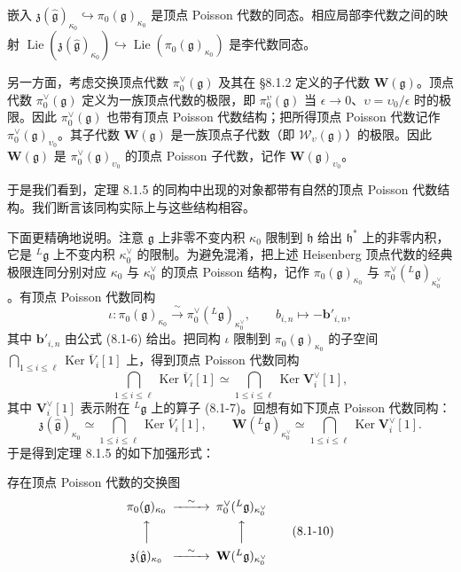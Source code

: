 \begin{lemma}
    嵌入 $\mathfrak z(\hat{\mathfrak g})_{\kappa_0}\hookrightarrow\pi_0(\mathfrak g)_{\kappa_0}$ 是顶点 Poisson 代数的同态。相应局部李代数之间的映射 $\operatorname{Lie}(\mathfrak z(\hat{\mathfrak g})_{\kappa_0})\hookrightarrow\operatorname{Lie}(\pi_0(\mathfrak g)_{\kappa_0})$ 是李代数同态。
\end{lemma}

另一方面，考虑交换顶点代数 $\pi^\vee_0(\mathfrak g)$ 及其在 §8.1.2 定义的子代数 $\mathbf W(\mathfrak g)$。顶点代数 $\pi^\vee_0(\mathfrak g)$ 定义为一族顶点代数的极限，即 $\pi^\upsilon_0(\mathfrak g)$ 当 $\epsilon\to0$、$\upsilon=\upsilon_0/\epsilon$ 时的极限。因此 $\pi^\vee_0(\mathfrak g)$ 也带有顶点 Poisson 代数结构；把所得顶点 Poisson 代数记作 $\pi^\vee_0(\mathfrak g)_{\upsilon_0}$。其子代数 $\mathbf W(\mathfrak g)$ 是一族顶点子代数（即 $\mathcal W_\upsilon(\mathfrak g)$）的极限。因此 $\mathbf W(\mathfrak g)$ 是 $\pi^\vee_0(\mathfrak g)_{\upsilon_0}$ 的顶点 Poisson 子代数，记作 $\mathbf W(\mathfrak g)_{\upsilon_0}$。

于是我们看到，定理 8.1.5 的同构中出现的对象都带有自然的顶点 Poisson 代数结构。我们断言该同构实际上与这些结构相容。

下面更精确地说明。注意 $\mathfrak g$ 上非零不变内积 $\kappa_0$ 限制到 $\mathfrak h$ 给出 $\mathfrak h^*$ 上的非零内积，它是 ${}^L\mathfrak g$ 上不变内积 $\kappa^\vee_0$ 的限制。为避免混淆，把上述 Heisenberg 顶点代数的经典极限连同分别对应 $\kappa_0$ 与 $\kappa^\vee_0$ 的顶点 Poisson 结构，记作 $\pi_0(\mathfrak g)_{\kappa_0}$ 与 $\pi^\vee_0({}^L\mathfrak g)_{\kappa^\vee_0}$。有顶点 Poisson 代数同构
\[
    \iota:\pi_0(\mathfrak g)_{\kappa_0}\xrightarrow{\ \sim\ }\pi^\vee_0({}^L\mathfrak g)_{\kappa^\vee_0},
    \qquad b_{i,n}\mapsto-\mathbf b'_{i,n},
\]
其中 $\mathbf b'_{i,n}$ 由公式 (8.1-6) 给出。把同构 $\iota$ 限制到 $\pi_0(\mathfrak g)_{\kappa_0}$ 的子空间 $\bigcap_{1\le i\le\ell}\operatorname{Ker}\overline V_i[1]$ 上，得到顶点 Poisson 代数同构
\[
    \bigcap_{1\le i\le\ell}\operatorname{Ker}\overline V_i[1]\simeq\bigcap_{1\le i\le\ell}\operatorname{Ker}\mathbf V^\vee_i[1],
\]
其中 $\mathbf V^\vee_i[1]$ 表示附在 ${}^L\mathfrak g$ 上的算子 (8.1-7)。回想有如下顶点 Poisson 代数同构：
\[
    \mathfrak z(\hat{\mathfrak g})_{\kappa_0}\simeq\bigcap_{1\le i\le\ell}\operatorname{Ker}\overline V_i[1],
    \qquad
    \mathbf W({}^L\mathfrak g)_{\kappa^\vee_0}\simeq\bigcap_{1\le i\le\ell}\operatorname{Ker}\mathbf V^\vee_i[1].
\]
于是得到定理 8.1.5 的如下加强形式：

\begin{theorem}
    存在顶点 Poisson 代数的交换图
    \begin{equation}
    \begin{CD}
    \pi_0(\mathfrak g)_{\kappa_0} @>{\sim}>> \pi_0^\vee({}^L\mathfrak g)_{\kappa^\vee_0}\\
    @AAA @AAA\\
    \mathfrak z(\hat{\mathfrak g})_{\kappa_0} @>{\sim}>> \mathbf W({}^L\mathfrak g)_{\kappa^\vee_0}
    \end{CD}
    \tag{8.1-10}
    \end{equation}
\end{theorem}


